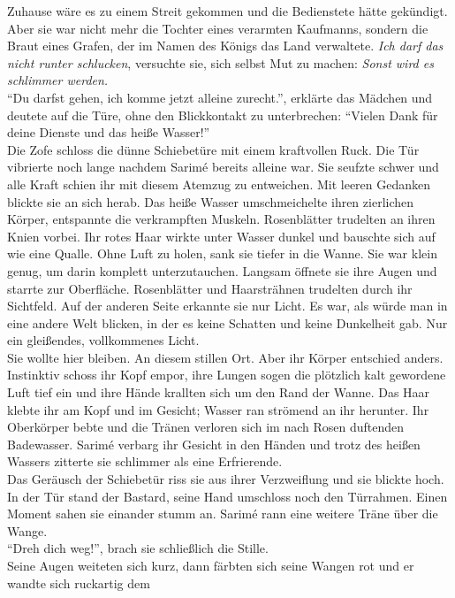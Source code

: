 Zuhause wäre es zu einem Streit gekommen und die Bedienstete hätte gekündigt. Aber sie war nicht 
mehr die Tochter eines verarmten Kaufmanns, sondern die Braut eines Grafen, der im Namen des Königs 
das Land verwaltete. \textit{Ich darf das nicht runter schlucken}, versuchte sie, sich selbst Mut zu 
machen: \textit{Sonst wird es schlimmer werden.}\\
``Du darfst gehen, ich komme jetzt alleine zurecht.'', erklärte das Mädchen und deutete auf die 
Türe, ohne den Blickkontakt zu unterbrechen: ``Vielen Dank für deine Dienste und das heiße 
Wasser!''\\
Die Zofe schloss die dünne Schiebetüre mit einem kraftvollen Ruck. Die Tür vibrierte noch lange 
nachdem Sarimé bereits alleine war. Sie seufzte schwer und alle Kraft schien ihr mit diesem Atemzug 
zu entweichen. Mit leeren Gedanken blickte sie an sich herab. Das heiße Wasser umschmeichelte ihren 
zierlichen Körper, entspannte die verkrampften Muskeln. Rosenblätter trudelten an ihren Knien 
vorbei. Ihr rotes Haar wirkte unter Wasser dunkel und bauschte sich auf wie eine Qualle. Ohne Luft 
zu holen, sank sie tiefer in die Wanne. Sie war klein genug, um darin komplett unterzutauchen. 
Langsam öffnete sie ihre Augen und starrte zur Oberfläche. Rosenblätter und Haarsträhnen trudelten 
durch ihr Sichtfeld. Auf der anderen Seite erkannte sie nur Licht. Es war, als würde man in eine 
andere Welt blicken, in der es keine Schatten und keine Dunkelheit gab. Nur ein gleißendes, 
vollkommenes Licht. \\
Sie wollte hier bleiben. An diesem stillen Ort. Aber ihr Körper entschied anders. Instinktiv schoss 
ihr Kopf empor, ihre Lungen sogen die plötzlich kalt gewordene Luft tief ein und ihre Hände 
krallten sich um den Rand der Wanne. Das Haar klebte ihr am Kopf und im Gesicht; Wasser ran 
strömend an ihr herunter. Ihr Oberkörper bebte und die Tränen verloren sich im nach Rosen duftenden 
Badewasser. Sarimé verbarg ihr Gesicht in den Händen und trotz des heißen Wassers zitterte sie 
schlimmer als eine Erfrierende.\\
Das Geräusch der Schiebetür riss sie aus ihrer Verzweiflung und sie blickte hoch. In der Tür stand 
der Bastard, seine Hand umschloss noch den Türrahmen. Einen Moment sahen sie einander stumm an. 
Sarimé rann eine weitere Träne über die Wange.\\
``Dreh dich weg!'', brach sie schließlich die Stille.\\
Seine Augen weiteten sich kurz, dann färbten sich seine Wangen rot und er wandte sich ruckartig dem 
